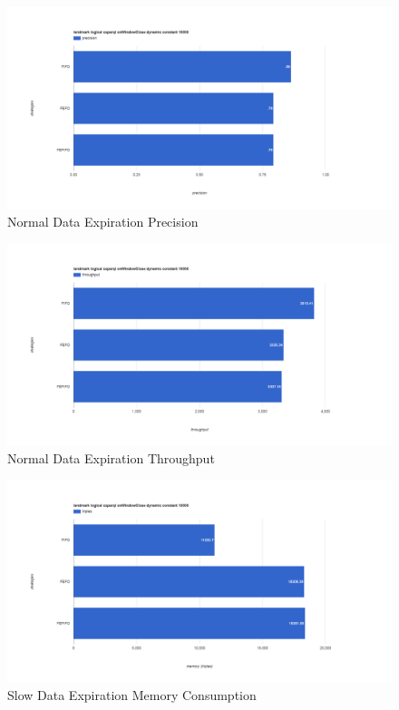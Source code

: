 \begin{figure}[!htbp]
	\centering
    \includegraphics[width=6.5in]{img/app3-ets-normal-p.png}
    \caption{Normal Data Expiration Precision}
\end{figure}
\begin{figure}[!htbp]
	\centering
    \includegraphics[width=6.5in]{img/app3-ets-normal-t.png}
    \caption{Normal Data Expiration Throughput}
\end{figure}
\begin{figure}[!htbp]
	\centering
    \includegraphics[width=6.5in]{img/app3-ets-slow-m.png}
    \caption{Slow Data Expiration Memory Consumption}
\end{figure}
